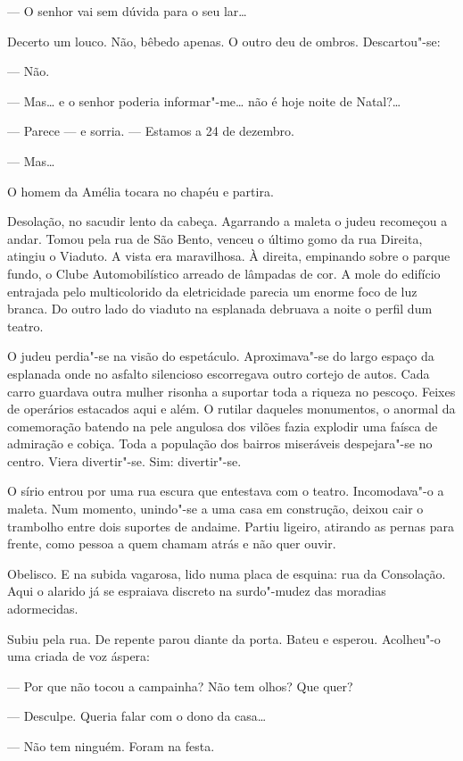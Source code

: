 --- O senhor vai sem dúvida para o seu lar\ldots{}

Decerto um louco. Não, bêbedo apenas. O outro deu de ombros.
Descartou"-se:

--- Não.

--- Mas\ldots{} e o senhor poderia informar"-me\ldots{} não é hoje noite de
Natal?\ldots{}

--- Parece ­­--- e sorria. --- Estamos a 24 de dezembro.

--- Mas\ldots{}

O homem da Amélia tocara no chapéu e partira.

Desolação, no sacudir lento da cabeça. Agarrando a maleta o judeu
recomeçou a andar. Tomou pela rua de São Bento, venceu o último gomo da
rua Direita, atingiu o Viaduto. A vista era maravilhosa. À direita,
empinando sobre o parque fundo, o Clube Automobilístico arreado de
lâmpadas de cor. A mole do edifício entrajada pelo multicolorido da
eletricidade parecia um enorme foco de luz branca. Do outro lado do
viaduto na esplanada debruava a noite o perfil dum teatro.

O judeu perdia"-se na visão do espetáculo. Aproximava"-se do largo espaço
da esplanada onde no asfalto silencioso escorregava outro cortejo de
autos. Cada carro guardava outra mulher risonha a suportar toda a
riqueza no pescoço. Feixes de operários estacados aqui e além. O rutilar
daqueles monumentos, o anormal da comemoração batendo na pele angulosa
dos vilões fazia explodir uma faísca de admiração e cobiça. Toda a
população dos bairros miseráveis despejara"-se no centro. Viera divertir"-se. Sim: divertir"-se.

O sírio entrou por uma rua escura que entestava com o teatro.
Incomodava"-o a maleta. Num momento, unindo"-se a uma casa em construção,
deixou cair o trambolho entre dois suportes de andaime. Partiu ligeiro,
atirando as pernas para frente, como pessoa a quem chamam atrás e não
quer ouvir.

Obelisco. E na subida vagarosa, lido numa placa de esquina: rua da
Consolação. Aqui o alarido já se espraiava discreto na surdo"-mudez das
moradias adormecidas.

Subiu pela rua. De repente parou diante da porta. Bateu e esperou.
Acolheu"-o uma criada de voz áspera:

--- Por que não tocou a campainha? Não tem olhos? Que quer?

--- Desculpe. Queria falar com o dono da casa\ldots{}

--- Não tem ninguém. Foram na festa.

